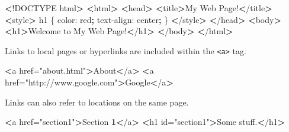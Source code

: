 \documentclass[]{book}
\newenvironment{Shaded}{\begin{snugshade}}{\end{snugshade}}
\newcommand{\ExtensionTok}[1]{#1}
\newcommand{\FunctionTok}[1]{\textcolor[rgb]{0.00,0.00,0.00}{#1}}
\newcommand{\KeywordTok}[1]{\textcolor[rgb]{0.13,0.29,0.53}{\textbf{#1}}}
\newcommand{\NormalTok}[1]{#1}
\newcommand{\OperatorTok}[1]{\textcolor[rgb]{0.81,0.36,0.00}{\textbf{#1}}}
\newcommand{\StringTok}[1]{\textcolor[rgb]{0.31,0.60,0.02}{#1}}
\begin{document}
\begin{Shaded}
\begin{Highlighting}[]
\OperatorTok{<}\NormalTok{!}\ExtensionTok{DOCTYPE}\NormalTok{ html}\OperatorTok{>}         
\OperatorTok{<}\ExtensionTok{html}\OperatorTok{>}                  
    \OperatorTok{<}\FunctionTok{head}\OperatorTok{>}                         
        \OperatorTok{<}\ExtensionTok{title}\OperatorTok{>}\NormalTok{My Web Page!}\OperatorTok{<}\NormalTok{/title}\OperatorTok{>}
        \OperatorTok{<}\ExtensionTok{style}\OperatorTok{>}                    
            \ExtensionTok{h1}\NormalTok{ \{                   }
                \ExtensionTok{color}\NormalTok{: red}\KeywordTok{;}        
                \ExtensionTok{text-align}\NormalTok{: center}\KeywordTok{;}
\NormalTok{            \}                      }
        \OperatorTok{<}\NormalTok{/}\ExtensionTok{style}\OperatorTok{>}                   
    \OperatorTok{<}\NormalTok{/}\ExtensionTok{head}\OperatorTok{>}                        
    \OperatorTok{<}\ExtensionTok{body}\OperatorTok{>}              
        \OperatorTok{<}\ExtensionTok{h1}\OperatorTok{>}\NormalTok{Welcome to My Web Page!}\OperatorTok{<}\NormalTok{/h1}\OperatorTok{>}
    \OperatorTok{<}\NormalTok{/}\ExtensionTok{body}\OperatorTok{>}             
\OperatorTok{<}\NormalTok{/}\ExtensionTok{html}\OperatorTok{>}                 
\end{Highlighting}
\end{Shaded}

Links to local pages or hyperlinks are included within the \texttt{\textless{}a\textgreater{}} tag.

\begin{Shaded}
\begin{Highlighting}[]
\OperatorTok{<}\ExtensionTok{a}\NormalTok{ href=}\StringTok{"about.html"}\OperatorTok{>}\NormalTok{About}\OperatorTok{<}\NormalTok{/a}\OperatorTok{>}
\OperatorTok{<}\ExtensionTok{a}\NormalTok{ href=}\StringTok{"http://www.google.com"}\OperatorTok{>}\NormalTok{Google}\OperatorTok{<}\NormalTok{/a}\OperatorTok{>}
\end{Highlighting}
\end{Shaded}

Links can also refer to locations on the same page.

\begin{Shaded}
\begin{Highlighting}[]
\OperatorTok{<}\ExtensionTok{a}\NormalTok{ href=}\StringTok{"section1"}\OperatorTok{>}\NormalTok{Section }\OperatorTok{1<}\NormalTok{/a}\OperatorTok{>}
\OperatorTok{<}\ExtensionTok{h1}\NormalTok{ id=}\StringTok{"section1"}\OperatorTok{>}\NormalTok{Some stuff.}\OperatorTok{<}\NormalTok{/h1}\OperatorTok{>}
\end{Highlighting}
\end{Shaded}
\end{document}

